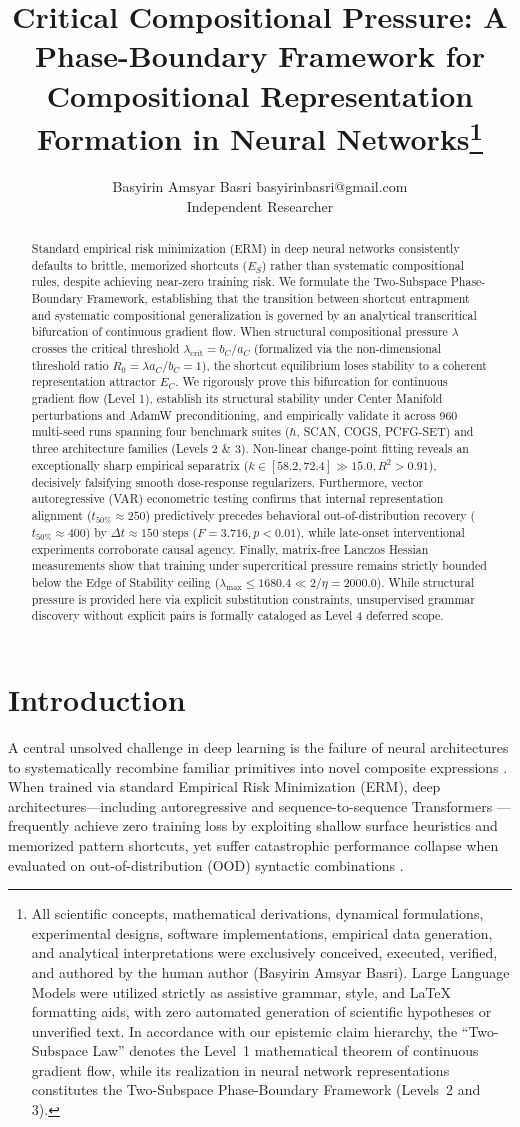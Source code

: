 \documentclass{article}
\title{Critical Compositional Pressure: A Phase-Boundary Framework for Compositional Representation Formation in Neural Networks\thanks{All scientific concepts, mathematical derivations, dynamical formulations, experimental designs, software implementations, empirical data generation, and analytical interpretations were exclusively conceived, executed, verified, and authored by the human author (Basyirin Amsyar Basri). Large Language Models were utilized strictly as assistive grammar, style, and \LaTeX{} formatting aids, with zero automated generation of scientific hypotheses or unverified text. In accordance with our epistemic claim hierarchy, the ``Two-Subspace Law'' denotes the Level~1 mathematical theorem of continuous gradient flow, while its realization in neural network representations constitutes the Two-Subspace Phase-Boundary Framework (Levels~2 and 3).}}
\author{\name Basyirin Amsyar Basri \email basyirinbasri@gmail.com \\
      \addr Independent Researcher}
\theoremstyle{plain}
\theoremstyle{definition}
\begin{document}
\maketitle

\begin{abstract}
Standard empirical risk minimization (ERM) in deep neural networks consistently defaults to brittle, memorized shortcuts ($E_S$) rather than systematic compositional rules, despite achieving near-zero training risk. We formulate the Two-Subspace Phase-Boundary Framework, establishing that the transition between shortcut entrapment and systematic compositional generalization is governed by an analytical transcritical bifurcation of continuous gradient flow. When structural compositional pressure $\lambda$ crosses the critical threshold $\lambda_{\text{crit}} = b_C / a_C$ (formalized via the non-dimensional threshold ratio $R_0 = \lambda a_C / b_C = 1$), the shortcut equilibrium loses stability to a coherent representation attractor $E_C$. We rigorously prove this bifurcation for continuous gradient flow (Level 1), establish its structural stability under Center Manifold perturbations and AdamW preconditioning, and empirically validate it across 960 multi-seed runs spanning four benchmark suites ($\hbar$, SCAN, COGS, PCFG-SET) and three architecture families (Levels 2 \& 3). Non-linear change-point fitting reveals an exceptionally sharp empirical separatrix ($k \in [58.2, 72.4] \gg 15.0, R^2 > 0.91$), decisively falsifying smooth dose-response regularizers. Furthermore, vector autoregressive (VAR) econometric testing confirms that internal representation alignment ($t_{50\%} \approx 250$) predictively precedes behavioral out-of-distribution recovery ($t_{50\%} \approx 400$) by $\Delta t \approx 150$ steps ($F = 3.716, p < 0.01$), while late-onset interventional experiments corroborate causal agency. Finally, matrix-free Lanczos Hessian measurements show that training under supercritical pressure remains strictly bounded below the Edge of Stability ceiling ($\lambda_{\text{max}} \le 1680.4 \ll 2/\eta = 2000.0$). While structural pressure is provided here via explicit substitution constraints, unsupervised grammar discovery without explicit pairs is formally cataloged as Level 4 deferred scope.
\end{abstract}
\section{Introduction}
\label{sec:introduction}

A central unsolved challenge in deep learning is the failure of neural architectures to systematically recombine familiar primitives into novel composite expressions \citep{Lake2018Generalization,Hupkes2019Compositionality,Keysers2019Measuring,Kim2020COGS}. When trained via standard Empirical Risk Minimization (ERM), deep architectures—including autoregressive and sequence-to-sequence Transformers \citep{Vaswani2017Attention}—frequently achieve zero training loss by exploiting shallow surface heuristics and memorized pattern shortcuts, yet suffer catastrophic performance collapse when evaluated on out-of-distribution (OOD) syntactic combinations \citep{Geirhos2020Shortcut,Kim2022Uncontrolled,Wu2023ReCOGS,Li2023SLOG}.
\end{document}
